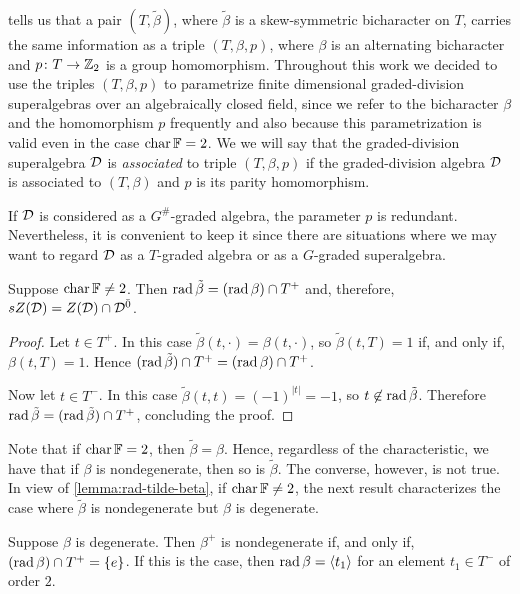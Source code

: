  tells us that a pair $(T, \tilde\beta)$, where $\tilde\beta$ is a skew-symmetric bicharacter on $T$, carries the same information as a triple $(T, \beta, p)$, where $\beta$ is an alternating bicharacter and $p\colon T\to \mathbb{Z}_2$ is a group homomorphism. 
Throughout this work we decided to use the triples $(T, \beta, p)$ to parametrize finite dimensional graded-division superalgebras over an algebraically closed field, since we refer to the bicharacter $\beta$ and the homomorphism $p$ frequently and also because this parametrization is valid even in the case $\operatorname{char} \mathbb{F} = 2$. 
We we will say that the graded-division superalgebra $\mathcal{D}$ is \emph{associated} to triple $(T, \beta, p)$ if the graded-division algebra $\mathcal{D}$ is associated to $(T, \beta)$ and $p$ is its parity homomorphism.

\begin{remark}
    If $\mathcal{D}$ is considered as a $G^\#$-graded algebra, the parameter $p$ is redundant. 
    Nevertheless, it is convenient to keep it since there are situations where we may want to regard $\mathcal{D}$ as a $T$-graded algebra or as a $G$-graded superalgebra.
\end{remark}

\begin{lemma}\label{lemma:rad-tilde-beta}
	Suppose $\operatorname{char} \mathbb{F} \neq 2$. 
	Then $\operatorname{rad} \tilde\beta = (\operatorname{rad} \beta)\cap T^+$ and, therefore, $sZ(\mathcal{D}) = Z(\mathcal{D})\cap \mathcal{D}^{\bar0}$.
\end{lemma}

\begin{proof}
	Let $t\in T^+$.
	In this case $\tilde\beta (t, \cdot) = \beta (t, \cdot)$, so
	$\tilde\beta (t, T) = 1$ if, and only if, $\beta (t, T) = 1$.
	Hence $(\operatorname{rad} \tilde\beta)\cap T^+ = (\operatorname{rad} \beta)\cap T^+$.

	Now let $t \in T^-$.
	In this case $\tilde \beta (t,t) = (-1)^{|t|} = -1$, so $t \not\in \operatorname{rad} \tilde\beta$.
	Therefore $\operatorname{rad} \tilde\beta = (\operatorname{rad} \tilde\beta)\cap T^+$, concluding the proof.
\end{proof}

Note that if $\operatorname{char} \mathbb{F} = 2$, then $\tilde\beta = \beta$. 
Hence, regardless of the characteristic, we have that if $\beta$ is nondegenerate, then so is $\tilde\beta$. 
The converse, however, is not true. 
In view of \cref{lemma:rad-tilde-beta}, if $\operatorname{char} \mathbb{F} \neq 2$, the next result characterizes the case where $\tilde\beta$ is nondegenerate but $\beta$ is degenerate. 

\begin{lemma}\label{lemma:beta-deg-beta-tilde-nondeg}
    Suppose $\beta$ is degenerate. 
    Then $\beta^+$ is nondegenerate if, and only if, $(\operatorname{rad} \beta) \cap T^+ = \{e\}$. 
    If this is the case, then $\operatorname{rad} \beta = \langle t_1 \rangle$ for an element $t_1 \in T^-$ of order $2$. 
\end{lemma}

